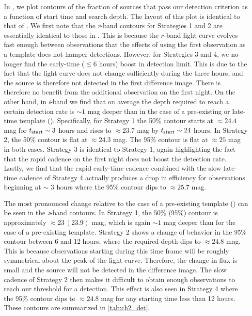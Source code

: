 In , we plot contours of the fraction of sources that pass our detection criterion as a function of start time and search depth. The layout of this plot is identical to that of . We first note that the {\em r}-band contours for Strategies 1 and 2 are essentially identical to those in . This is because the $r$-band light curve evolves fast enough between observations that the effects of using the first observation as a template does not hamper detections. However, for Strategies 3 and 4, we no longer find the early-time ($\lesssim6$ hours) boost in detection limit. This is due to the fact that the light curve does not change sufficiently during the three hours, and the source is therefore not detected in the first difference image. There is therefore no benefit from the additional observation on the first night. On the other hand, in {\em i}-band we find that on average the depth required to reach a certain detection rate is $\sim 1$ mag deeper than in the case of a pre-existing or late-time template (). Specifically, for Strategy 1 the 50\% contour starts at $\approx24.4$ mag for $t_{{\rm start}} \sim 3$ hours and rises to $\approx 23.7$ mag by $t_{{\rm start}} \sim24$ hours. In Strategy 2, the 50\% contour is flat at $\approx24.3$ mag. The 95\% contour is flat at $\approx25$ mag in both cases. Strategy 3 is identical to Strategy 1, again highlighting the fact that the rapid cadence on the first night does not boost the detection rate. Lastly, we find that the rapid early-time cadence combined with the slow late-time cadence of Strategy 4 actually produces a drop in efficiency for observations beginning at $\sim$ 3 hours where the 95\% contour dips to $\approx 25.7$ mag.

The most pronounced change relative to the case of a pre-existing template () can be seen in the {\em z}-band contours. In Strategy 1, the 50\% (95\%) contour is approximately $\approx 23\,(23.9)$ mag, which is again $\sim 1$ mag deeper than for the case of a pre-existing template. Strategy 2 shows a change of behavior in the 95\% contour between 6 and 12 hours, where the required depth dips to $\approx 24.8$ mag. This is because observations starting during this time frame will be roughly symmetrical about the peak of the light curve. Therefore, the change in flux is small and the source will not be detected in the difference image. The slow cadence of Strategy 2 then makes it difficult to obtain enough observations to reach our threshold for a detection. This effect is also seen in Strategy 4 where the 95\% contour dips to $\approx 24.8$ mag for any starting time less than 12 hours. These contours are summarized in \cref{tab:ch2_det}.

